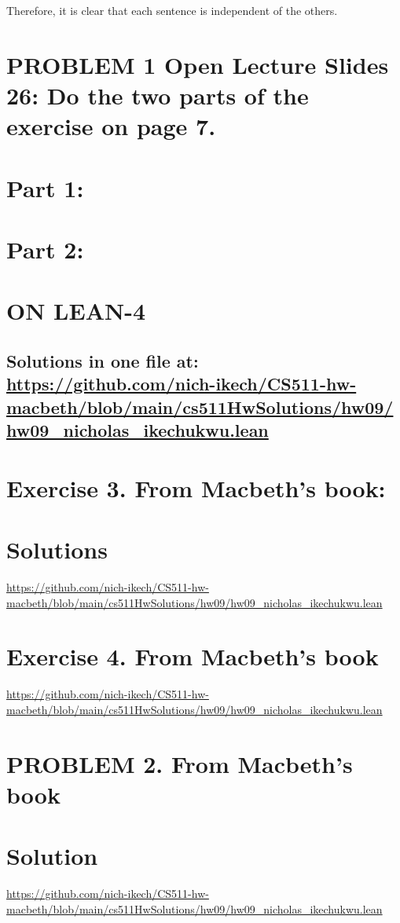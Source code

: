 \documentclass{article}
\begin{document}
Therefore, it is clear that each sentence is independent of the others.
\newpage

\section*{PROBLEM 1  Open Lecture Slides 26: Do the two parts of the exercise on page 7.}

\section*{Part 1:}



\newpage


\section*{Part 2:}



\newpage




\section*{ON LEAN-4}
\subsection*{Solutions in one file at: 
\url{https://github.com/nich-ikech/CS511-hw-macbeth/blob/main/cs511HwSolutions/hw09/hw09_nicholas_ikechukwu.lean}}

\newpage

\section*{Exercise 3. From Macbeth’s book:}
\section*{Solutions}
\url{https://github.com/nich-ikech/CS511-hw-macbeth/blob/main/cs511HwSolutions/hw09/hw09_nicholas_ikechukwu.lean}

\newpage

\section*{Exercise 4. From Macbeth's book}

\url{https://github.com/nich-ikech/CS511-hw-macbeth/blob/main/cs511HwSolutions/hw09/hw09_nicholas_ikechukwu.lean}

\newpage

\section*{PROBLEM 2. From Macbeth's book}
\section*{Solution}

\url{https://github.com/nich-ikech/CS511-hw-macbeth/blob/main/cs511HwSolutions/hw09/hw09_nicholas_ikechukwu.lean}
\end{document}
